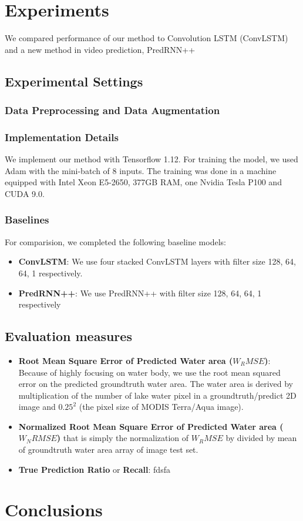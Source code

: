 \section{Experiments}
We compared performance of our method to Convolution LSTM (ConvLSTM) and a new method in video prediction, PredRNN++ %

\subsection{Experimental Settings}
\subsubsection{Data Preprocessing and Data Augmentation}

\subsubsection{Implementation Details}
We implement our method with Tensorflow 1.12. %
For training the model, we used Adam %
with the mini-batch of 8 inputs. The training was done in a machine equipped with Intel Xeon E5-2650, 377GB RAM, one Nvidia Tesla P100 and CUDA 9.0.

\subsubsection{Baselines}
For comparision, we completed the following baseline models:
\begin{itemize}
    \item \textbf{ConvLSTM}: We use four stacked ConvLSTM layers with filter size 128, 64, 64, 1 respectively. 
    \item \textbf{PredRNN++}: We use PredRNN++ with filter size 128, 64, 64, 1 respectively
\end{itemize}

\subsection{Evaluation measures}
\begin{itemize}
    \item \textbf{Root Mean Square Error of Predicted Water area ($W_RMSE$)}: Because of highly focusing on water body, we use the root mean squared error on the predicted groundtruth water area. The water area is derived by multiplication of the number of lake water pixel in a groundtruth/predict 2D image and $0.25^2$ (the pixel size of MODIS Terra/Aqua image).
    \item \textbf{Normalized Root Mean Square Error of Predicted Water area ($W_NRMSE$)} that is simply the normalization of $W_RMSE$ by divided by mean of groundtruth water area array of image test set.
    \item \textbf{True Prediction Ratio} or \textbf{Recall}: fdsfa
\end{itemize}

\section{Conclusions}

